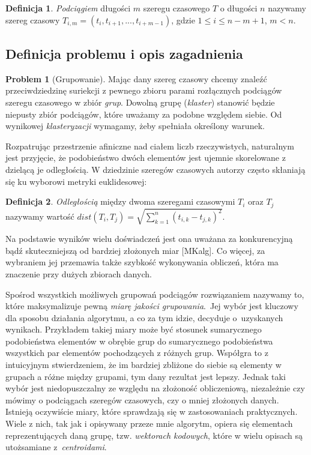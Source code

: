 \documentclass{article}
\theoremstyle{definition}
\newtheorem{defn}{Definicja}
\newtheorem*{prob}{Problem}
\begin{document}
\begin{defn}
\textit{Podciągiem} długości $m$ szeregu czasowego $T$ o długości $n$
nazywamy szereg czasowy $T_{i,m} = (t_{i}, t_{i+1}, ..., t_{i+m-1})$, gdzie $1 \leqslant i \leqslant n -m+1$, $m < n$.
\end{defn}

\subsection{Definicja problemu i opis zagadnienia}

\begin{prob}[Grupowanie]
Mając dany szereg czasowy chcemy znaleźć przeciwdziedzinę suriekcji z pewnego zbioru parami rozłącznych podciągów
szeregu czasowego w zbiór \textit{grup}. Dowolną grupę (\textit{klaster}) stanowić będzie niepusty zbiór podciągów, które uważamy za podobne względem siebie. Od wynikowej \textit{klasteryzacji} wymagamy, żeby spełniała określony warunek.
\end{prob}

Rozpatrując przestrzenie afiniczne nad ciałem liczb rzeczywistych, naturalnym jest przyjęcie, że
podobieństwo dwóch elementów jest ujemnie skorelowane z dzielącą je odległością. W dziedzinie 
szeregów czasowych autorzy często skłaniają się ku wyborowi metryki euklidesowej:

\begin{defn}
\textit{Odległością} między dwoma szeregami czasowymi $T_{i}$ oraz $T_{j}$ nazywamy wartość
$dist(T_{i},T_{j}) = \sqrt{\sum_{k=1}^{n} (t_{i,k}-t_{j,k})^2}$.
\end{defn}

Na podstawie wyników wielu doświadczeń jest ona uważana za konkurencyjną bądź skuteczniejszą od bardziej
złożonych miar [MKalg]. Co więcej, za wybraniem jej przemawia także szybkość wykonywania obliczeń, 
która ma znaczenie przy dużych zbiorach danych. 

Spośrod wszystkich możliwych grupowań podciągów rozwiązaniem nazywamy to, które maksymalizuje pewną
\textit{miarę jakości grupowania}.~Jej wybór jest kluczowy dla sposobu działania algorytmu, a co za tym idzie,
decyduje o~uzyskanych wynikach. Przykładem takiej miary może być stosunek sumarycznego podobieństwa 
elementów w obrębie grup do sumarycznego podobieństwa wszystkich par elementów pochodzących z różnych grup.
Współgra to z intuicyjnym stwierdzeniem, że im bardziej zbliżone do siebie są elementy w grupach a różne między grupami,
tym dany rezultat jest lepszy. Jednak taki wybór jest niedopuszczalny ze względu na złożoność obliczeniową,
niezależnie czy mówimy o podciągach szeregów czasowych, czy o mniej złożonych danych.
Istnieją oczywiście miary, które sprawdzają się w zastosowaniach praktycznych. Wiele z nich, tak jak i opisywany
przeze mnie algorytm, opiera się elementach reprezentujących daną grupę, tzw. \textit{wektorach kodowych}, które w wielu opisach 
są utożsamiane z~\textit{centroidami}.
\end{document}
